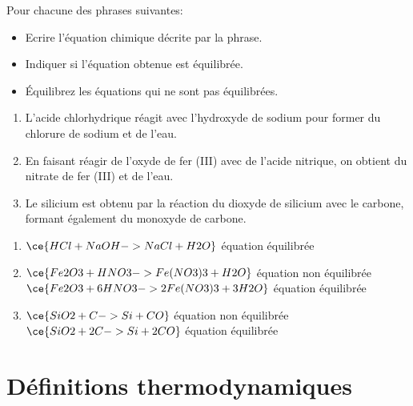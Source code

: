 \documentclass[
  11pt,
  french,
  a4paper,
  openany]{book}
\providecommand{\tightlist}{%
  \setlength{\itemsep}{0pt}\setlength{\parskip}{0pt}}
\begin{document}
\begin{Exercise}

Pour chacune des phrases suivantes:

\begin{itemize}
\tightlist
\item
  Ecrire l'équation chimique décrite par la phrase.
\item
  Indiquer si l'équation obtenue est équilibrée.
\item
  Équilibrez les équations qui ne sont pas équilibrées.
\end{itemize}

\begin{enumerate}
\def\labelenumi{\arabic{enumi}.}
\tightlist
\item
  L'acide chlorhydrique réagit avec l'hydroxyde de sodium pour former du chlorure de sodium et de l'eau.
\item
  En faisant réagir de l'oxyde de fer (III) avec de l'acide nitrique, on obtient du nitrate de fer (III) et de l'eau.
\item
  Le silicium est obtenu par la réaction du dioxyde de silicium avec le carbone, formant également du monoxyde de carbone.
\end{enumerate}


\end{Exercise}

\begin{Answer}

\begin{enumerate}
\def\labelenumi{\arabic{enumi}.}
\item
  \(\ce{HCl + NaOH -> NaCl + H2O}\) équation équilibrée
\item
  \(\ce{Fe2O3 + HNO3 -> Fe(NO3)3 + H2O}\) équation non équilibrée\\
  \(\ce{Fe2O3 + 6HNO3 -> 2Fe(NO3)3 + 3H2O}\) équation équilibrée
\item
  \(\ce{SiO2 + C -> Si + CO}\) équation non équilibrée\\
  \(\ce{SiO2 + 2C -> Si + 2CO}\) équation équilibrée
\end{enumerate}


\end{Answer}

\newpage

\hypertarget{duxe9finitions-thermodynamiques}{%
\section{Définitions thermodynamiques}\label{duxe9finitions-thermodynamiques}}
\end{document}
